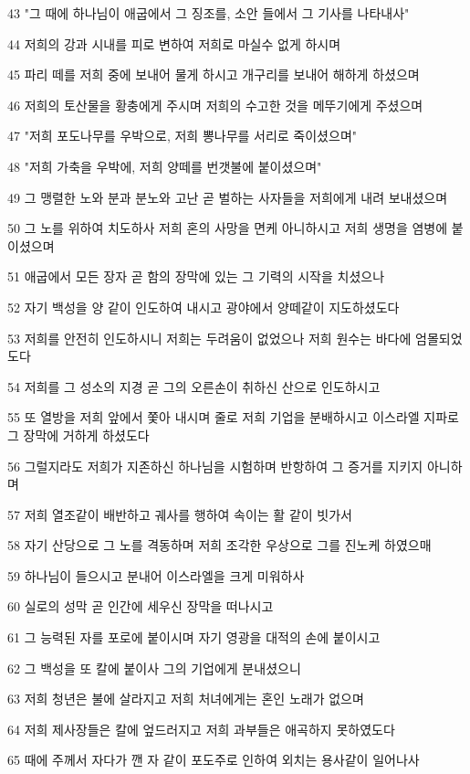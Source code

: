 \par 43 "그 때에 하나님이 애굽에서 그 징조를, 소안 들에서 그 기사를 나타내사"
\par 44 저희의 강과 시내를 피로 변하여 저희로 마실수 없게 하시며
\par 45 파리 떼를 저희 중에 보내어 물게 하시고 개구리를 보내어 해하게 하셨으며
\par 46 저희의 토산물을 황충에게 주시며 저희의 수고한 것을 메뚜기에게 주셨으며
\par 47 "저희 포도나무를 우박으로, 저희 뽕나무를 서리로 죽이셨으며"
\par 48 "저희 가축을 우박에, 저희 양떼를 번갯불에 붙이셨으며"
\par 49 그 맹렬한 노와 분과 분노와 고난 곧 벌하는 사자들을 저희에게 내려 보내셨으며
\par 50 그 노를 위하여 치도하사 저희 혼의 사망을 면케 아니하시고 저희 생명을 염병에 붙이셨으며
\par 51 애굽에서 모든 장자 곧 함의 장막에 있는 그 기력의 시작을 치셨으나
\par 52 자기 백성을 양 같이 인도하여 내시고 광야에서 양떼같이 지도하셨도다
\par 53 저희를 안전히 인도하시니 저희는 두려움이 없었으나 저희 원수는 바다에 엄몰되었도다
\par 54 저희를 그 성소의 지경 곧 그의 오른손이 취하신 산으로 인도하시고
\par 55 또 열방을 저희 앞에서 쫓아 내시며 줄로 저희 기업을 분배하시고 이스라엘 지파로 그 장막에 거하게 하셨도다
\par 56 그럴지라도 저희가 지존하신 하나님을 시험하며 반항하여 그 증거를 지키지 아니하며
\par 57 저희 열조같이 배반하고 궤사를 행하여 속이는 활 같이 빗가서
\par 58 자기 산당으로 그 노를 격동하며 저희 조각한 우상으로 그를 진노케 하였으매
\par 59 하나님이 들으시고 분내어 이스라엘을 크게 미워하사
\par 60 실로의 성막 곧 인간에 세우신 장막을 떠나시고
\par 61 그 능력된 자를 포로에 붙이시며 자기 영광을 대적의 손에 붙이시고
\par 62 그 백성을 또 칼에 붙이사 그의 기업에게 분내셨으니
\par 63 저희 청년은 불에 살라지고 저희 처녀에게는 혼인 노래가 없으며
\par 64 저희 제사장들은 칼에 엎드러지고 저희 과부들은 애곡하지 못하였도다
\par 65 때에 주께서 자다가 깬 자 같이 포도주로 인하여 외치는 용사같이 일어나사
